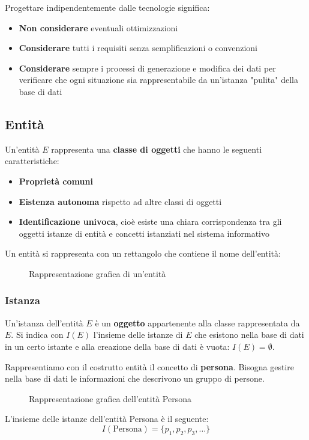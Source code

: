 \documentclass[a4paper]{article}
\begin{document}
\vspace{1em}
\noindent
Progettare indipendentemente dalle tecnologie significa:
\begin{itemize}
  \item \textbf{Non considerare} eventuali ottimizzazioni
  \item \textbf{Considerare} tutti i requisiti senza semplificazioni o convenzioni
  \item \textbf{Considerare} sempre i processi di generazione e modifica dei dati
    per verificare che ogni situazione sia rappresentabile da un'istanza "pulita"
    della base di dati
\end{itemize}

\subsection{Entità}
Un'entità \( E \) rappresenta una \textbf{classe di oggetti} che hanno le seguenti
caratteristiche:
\begin{itemize}
  \item \textbf{Proprietà comuni}
  \item \textbf{Eistenza autonoma} rispetto ad altre classi di oggetti
  \item \textbf{Identificazione univoca}, cioè esiste una chiara corrispondenza tra
    gli oggetti istanze di entità e concetti istanziati nel sistema informativo
\end{itemize}
Un entità si rappresenta con un rettangolo che contiene il nome dell'entità:
\begin{figure}[H]
  \centering
  \caption{Rappresentazione grafica di un'entità}
\end{figure}

\subsubsection{Istanza}
Un'istanza dell'entità \( E \) è un \textbf{oggetto} appartenente alla classe rappresentata
da \( E \). Si indica con \( I(E) \) l'insieme delle istanze di \( E \) che esistono
nella base di dati in un certo istante e alla creazione della base di dati è vuota:
\( I(E) = \emptyset \).

\begin{example}
  Rappresentiamo con il costrutto entità il concetto di \textbf{persona}. Bisogna gestire
  nella base di dati le informazioni che descrivono un gruppo di persone.
  \begin{figure}[H]
    \centering
    \caption{Rappresentazione grafica dell'entità Persona}
  \end{figure}
  L'insieme delle istanze dell'entità Persona è il seguente:
  \[
    I(\text{Persona}) = \{p_1, p_2, p_3, \ldots\}
  \]
\end{example}
\end{document}
